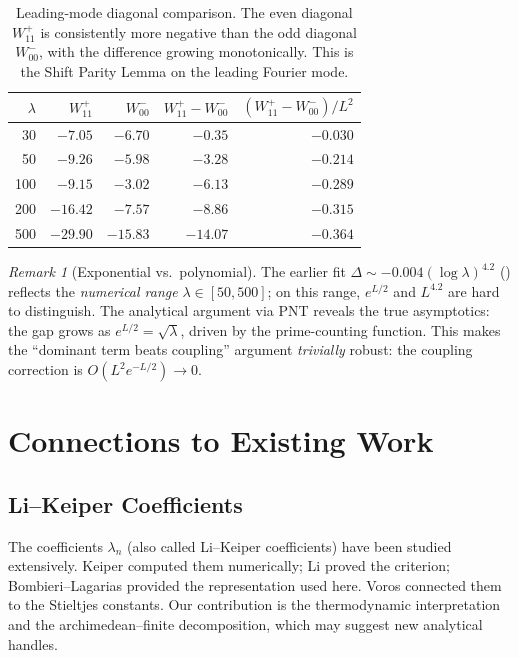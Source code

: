 \documentclass[12pt,a4paper]{article}
\theoremstyle{definition}
\theoremstyle{remark}
\newtheorem{remark}[theorem]{Remark}
\begin{document}
\begin{table}[h]
\centering
\small
\renewcommand{\arraystretch}{1.15}
\begin{tabular}{r|r|r|r|r}
$\lambda$ & $W_{11}^+$ & $W_{00}^-$ & $W_{11}^+\! -\! W_{00}^-$ & $(W_{11}^+\! -\! W_{00}^-)/L^2$ \\\hline
30  & $-7.05$  & $-6.70$  & $-0.35$ & $-0.030$ \\
50  & $-9.26$  & $-5.98$  & $-3.28$ & $-0.214$ \\
100 & $-9.15$  & $-3.02$  & $-6.13$ & $-0.289$ \\
200 & $-16.42$ & $-7.57$  & $-8.86$ & $-0.315$ \\
500 & $-29.90$ & $-15.83$ & $-14.07$ & $-0.364$
\end{tabular}
\caption{Leading-mode diagonal comparison. The even diagonal $W_{11}^+$ is consistently more negative than the odd diagonal $W_{00}^-$, with the difference growing monotonically. This is the Shift Parity Lemma on the leading Fourier mode.}
\label{tab:leading-mode}
\end{table}

\begin{remark}[Exponential vs.\ polynomial]
The earlier fit $\Delta \sim -0.004 (\log\lambda)^{4.2}$ () reflects the \emph{numerical range} $\lambda \in [50, 500]$; on this range, $e^{L/2}$ and $L^{4.2}$ are hard to distinguish. The analytical argument via PNT reveals the true asymptotics: the gap grows as $e^{L/2} = \sqrt{\lambda}$, driven by the prime-counting function. This makes the ``dominant term beats coupling'' argument \emph{trivially} robust: the coupling correction is $O(L^2 e^{-L/2}) \to 0$.
\end{remark}


\section{Connections to Existing Work}

\subsection{Li--Keiper Coefficients}
The coefficients $\lambda_n$ (also called Li--Keiper coefficients) have been studied extensively. Keiper \cite{Keiper1992} computed them numerically; Li \cite{Li1997} proved the criterion; Bombieri--Lagarias \cite{BombieriLagarias1999} provided the representation used here. Voros \cite{Voros2004} connected them to the Stieltjes constants. Our contribution is the thermodynamic interpretation and the archimedean--finite decomposition, which may suggest new analytical handles.
\end{document}
